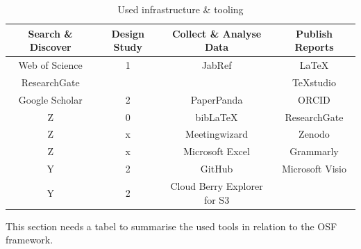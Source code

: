 \begin{table}[!h]
	\begin{center}
		\begin{tabular}{@{}cccc@{}}
			\toprule
			Search \& Discover & Design Study & Collect \& Analyse Data & Publish Reports\\ \midrule
			Web of Science & 1    & JabRef   & \LaTeX \\%
			ResearchGate   &      &           & TeXstudio \\%
			Google Scholar & 2    & PaperPanda  & ORCID \\%
			Z	 & 0    & bib\LaTeX   & ResearchGate \\%
			Z	 &	x	& Meetingwizard	  & Zenodo \\%
			Z	 &	x	& Microsoft Excel  & Grammarly \\%
			Y    & 2    & GitHub  & Microsoft Visio \\%
			Y	 & 2	& Cloud Berry Explorer for S3 & \\%
			\bottomrule
		\end{tabular}
		\caption{Used infrastructure \& tooling}
		\label{tab:usedinfrastructuretooling}
	\end{center}
\end{table}

\begin{remark}
	This section needs a tabel to summarise the used tools in relation to the OSF framework.
\end{remark}